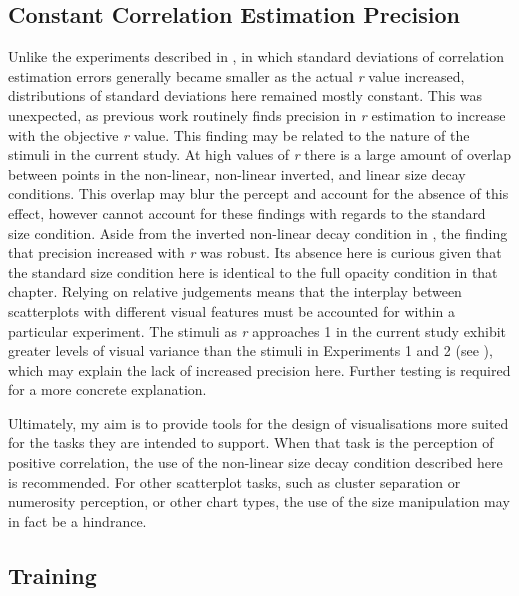 \documentclass[../main.tex]{subfiles}
\begin{document}
\subsection{Constant Correlation Estimation
Precision}\label{constant-correlation-estimation-precision}

Unlike the experiments described in , in
which standard deviations of correlation estimation errors generally
became smaller as the actual \emph{r} value increased, distributions of
standard deviations here remained mostly constant. This was unexpected,
as previous work
\cite{rensink_2010, rensink_2012, rensink_2014, rensink_2017} routinely
finds precision in \emph{r} estimation to increase with the objective
\emph{r} value. This finding may be related to the nature of the stimuli
in the current study. At high values of \emph{r} there is a large amount
of overlap between points in the non-linear, non-linear inverted, and
linear size decay conditions. This overlap may blur the percept and
account for the absence of this effect, however cannot account for these
findings with regards to the standard size condition. Aside from the
inverted non-linear decay condition in ,
the finding that precision increased with \emph{r} was robust. Its
absence here is curious given that the standard size condition here is
identical to the full opacity condition in that chapter. Relying on
relative judgements means that the interplay between scatterplots with
different visual features must be accounted for within a particular
experiment. The stimuli as \emph{r} approaches 1 in the current study
exhibit greater levels of visual variance than the stimuli in
Experiments 1 and 2 (see ), which may
explain the lack of increased precision here. Further testing is
required for a more concrete explanation.

Ultimately, my aim is to provide tools for the design of visualisations
more suited for the tasks they are intended to support. When that task
is the perception of positive correlation, the use of the non-linear
size decay condition described here is recommended. For other
scatterplot tasks, such as cluster separation or numerosity perception,
or other chart types, the use of the size manipulation may in fact be a
hindrance.

\subsection{Training}\label{training-e3}
\end{document}
